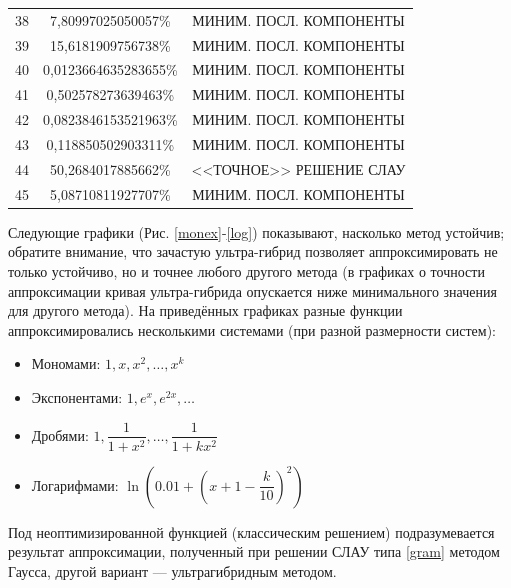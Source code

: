 \documentclass[a4paper]{article}
\begin{document}
\begin{table}[h]
\begin{center}
\begin{tabular}[t]{|c|c|c|}
      38       & 7,80997025050057\%     & МИНИМ. ПОСЛ. КОМПОНЕНТЫ   \\
      39       & 15,6181909756738\%     & МИНИМ. ПОСЛ. КОМПОНЕНТЫ   \\
      40       & 0,0123664635283655\%   & МИНИМ. ПОСЛ. КОМПОНЕНТЫ   \\
      41       & 0,502578273639463\%    & МИНИМ. ПОСЛ. КОМПОНЕНТЫ   \\
      42       & 0,0823846153521963\%   & МИНИМ. ПОСЛ. КОМПОНЕНТЫ   \\
      43       & 0,118850502903311\%    & МИНИМ. ПОСЛ. КОМПОНЕНТЫ   \\
      44       & 50,2684017885662\%     & <<ТОЧНОЕ>> РЕШЕНИЕ СЛАУ   \\
      45       & 5,08710811927707\%     & МИНИМ. ПОСЛ. КОМПОНЕНТЫ   \\
      \hline
    \end{tabular}
  \end{center}
\end{table}



Следующие графики (Рис. \ref{monex}-\ref{log}) показывают, насколько метод устойчив;
обратите внимание, что зачастую ультра-гибрид позволяет аппроксимировать не только устойчиво,
но и точнее любого другого метода (в графиках о точности аппроксимации кривая ультра-гибрида опускается ниже минимального значения для другого метода).
На приведённых графиках разные функции аппроксимировались несколькими системами (при разной размерности систем):
\begin{itemize}
  \item Мономами: $1, x, x^2,\dots , x^k$
  \item Экспонентами: $1, e^x, e^{2x},\dots$
  \item Дробями: $1,\dfrac{1}{1+x^2}, \dots , \dfrac{1}{1+kx^2}$
  \item Логарифмами: $\ln\left(0.01 + \left(x+1-\dfrac{k}{10}\right)^2\right)$
\end{itemize}
Под неоптимизированной функцией (классическим решением) подразумевается результат аппроксимации, полученный при решении СЛАУ типа \ref{gram} методом Гаусса, другой вариант --- ультрагибридным методом.
\end{document}
